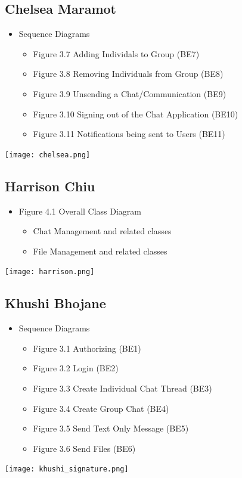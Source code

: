 \documentclass[]{article}
\begin{document}
\subsection{Chelsea Maramot}
\label{subsec:chelsea_maramot}
\begin{itemize}
	\item Sequence Diagrams
 		\begin{itemize}
   			\item Figure 3.7 Adding Individals to Group (BE7)
      			\item Figure 3.8 Removing Individuals from Group (BE8)
	 		\item Figure 3.9 Unsending a Chat/Communication (BE9)
    			\item Figure 3.10 Signing out of the Chat Application (BE10)
       			\item Figure 3.11 Notifications being sent to Users (BE11)
      		\end{itemize}
\end{itemize}
\texttt{[image: chelsea.png]}

\subsection{Harrison Chiu}
\label{subsec:harrison_chiu}
\begin{itemize}
	\item Figure 4.1 Overall Class Diagram
 		\begin{itemize}
   			\item Chat Management and related classes
      			\item File Management and related classes
	 	\end{itemize}
\end{itemize}
\texttt{[image: harrison.png]}

\subsection{Khushi Bhojane}
\label{subsec:khushi_bhojane}
\begin{itemize}
	\item Sequence Diagrams
 		\begin{itemize}
   			\item Figure 3.1 Authorizing (BE1)
      			\item Figure 3.2 Login (BE2)
	 		\item Figure 3.3 Create Individual Chat Thread (BE3)
    			\item Figure 3.4 Create Group Chat (BE4)
       			\item Figure 3.5 Send Text Only Message (BE5)
	  		\item Figure 3.6 Send Files (BE6)
      		\end{itemize}
\end{itemize}
\texttt{[image: khushi\_signature.png]}
\end{document}
